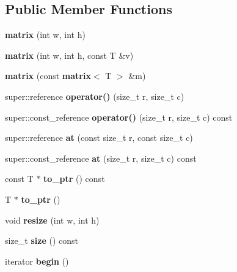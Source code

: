 \subsection*{Public Member Functions}
\begin{DoxyCompactItemize}
\item 
{\bfseries matrix} (int w, int h)\label{classmath3d_1_1matrix_a485a360ddac670925cf35f59607aceec}

\item 
{\bfseries matrix} (int w, int h, const T \&v)\label{classmath3d_1_1matrix_a76c18cee63a4be66605d325885b98d0c}

\item 
{\bfseries matrix} (const {\bf matrix}$<$ T $>$ \&m)\label{classmath3d_1_1matrix_af21315b87d22fd38a97754fec9930804}

\item 
super\-::reference {\bfseries operator()} (size\-\_\-t r, size\-\_\-t c)\label{classmath3d_1_1matrix_a9dcb53e06bf4744013c6bebd33bbbd25}

\item 
super\-::const\-\_\-reference {\bfseries operator()} (size\-\_\-t r, size\-\_\-t c) const \label{classmath3d_1_1matrix_ac2c867b0b09b6712f05042b4050ce64e}

\item 
super\-::reference {\bfseries at} (const size\-\_\-t r, const size\-\_\-t c)\label{classmath3d_1_1matrix_a645364baf04f21c563b895fbcfee1434}

\item 
super\-::const\-\_\-reference {\bfseries at} (size\-\_\-t r, size\-\_\-t c) const \label{classmath3d_1_1matrix_a4a452f8a6edcfd40f458dd0b7e804f8c}

\item 
const T $\ast$ {\bfseries to\-\_\-ptr} () const \label{classmath3d_1_1matrix_a8f1486fcc0a67e129cea2371c24212d7}

\item 
T $\ast$ {\bfseries to\-\_\-ptr} ()\label{classmath3d_1_1matrix_abb550aad56b9509edb88193f3e4cb07c}

\item 
void {\bfseries resize} (int w, int h)\label{classmath3d_1_1matrix_ad96d503391e553b25fd16af6b2d42b69}

\item 
size\-\_\-t {\bfseries size} () const \label{classmath3d_1_1matrix_a7804f775d736cec4861f28ec2255fde7}

\item 
iterator {\bfseries begin} ()\label{classmath3d_1_1matrix_a77723a38cb4d3d3c72b17408baa9b47a}


\end{DoxyCompactItemize}
